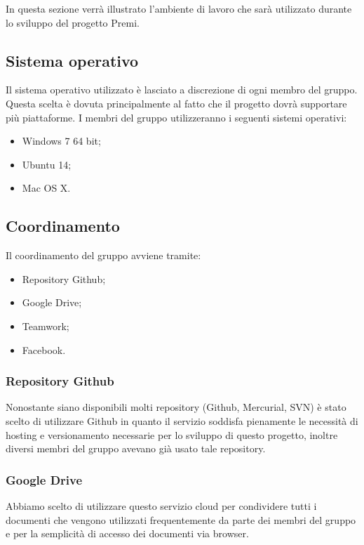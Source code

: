 In questa sezione verrà illustrato l'ambiente di lavoro che sarà utilizzato durante lo sviluppo del progetto Premi.\\

\subsection{Sistema operativo}

Il sistema operativo utilizzato è lasciato a discrezione di ogni membro del gruppo. Questa scelta è dovuta principalmente al fatto che il progetto dovrà supportare più piattaforme.
I membri del gruppo utilizzeranno i seguenti sistemi operativi:

\begin{itemize}
	\item Windows 7 64 bit;
	\item Ubuntu 14;
	\item Mac OS X.
\end{itemize}

\subsection{Coordinamento}

Il coordinamento del gruppo avviene tramite:
\begin{itemize}
	\item Repository Github;
	\item Google Drive;
	\item Teamwork;
	\item Facebook.
\end{itemize}

\subsubsection{Repository Github}

Nonostante siano disponibili molti repository (Github, Mercurial, SVN) è stato scelto di utilizzare Github in quanto il servizio soddisfa pienamente le necessità di hosting e versionamento necessarie per lo sviluppo di questo progetto, inoltre diversi membri del gruppo avevano già usato tale repository.

\subsubsection{Google Drive}

Abbiamo scelto di utilizzare questo servizio cloud per condividere tutti i documenti che vengono utilizzati frequentemente da parte dei membri del gruppo e per la semplicità di accesso dei documenti via browser.

